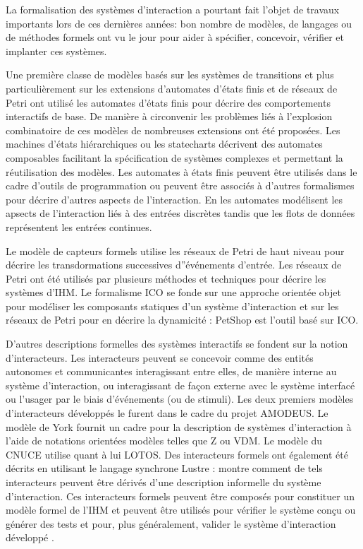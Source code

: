 \documentclass{ihm}
\begin{document}
La formalisation des systèmes d'interaction a pourtant fait l'objet de
travaux  importants  lors  de  ces dernières  années:  bon  nombre  de
modèles, de langages ou de méthodes  formels ont vu le jour pour aider
à spécifier, concevoir, vérifier et implanter ces systèmes.

Une première classe  de modèles basés sur les  systèmes de transitions
et plus particulièrement sur  les extensions d'automates d'états finis
et de  réseaux de Petri ont  utilisé les automates d'états  finis pour
décrire  des   comportements  interactifs  de  base.    De  manière  à
circonvenir  les  problèmes liés  à  l'explosion  combinatoire de  ces
modèles  de  nombreuses extensions  ont  été  proposées. Les  machines
d'états  hiérarchiques  ou  les statecharts  décrivent  des  automates
composables  facilitant  la  spécification de  systèmes  complexes  et
permettant la réutilisation  des modèles. Les automates  à états finis
peuvent  être  utilisés  dans   le  cadre  d'outils  de  programmation
\cite{Blanch02,Blanch06}   ou  peuvent   être   associés  à   d'autres
formalismes      pour      décrire       d'autres      aspects      de
l'interaction. En \cite{Jacob99} les  automates modélisent les apsects
de l'interaction liés à des entrées  discrètes tandis que les flots de
données représentent les entrées continues. 

Le modèle  de capteurs formels  \cite{Accot97} utilise les  réseaux de
Petri de haut niveau  \cite{Jensen95} pour décrire les transdormations
successives  d''événements  d'entrée. Les  réseaux  de  Petri ont  été
utilisés  par  plusieurs  méthodes  et  techniques  pour  décrire  les
systèmes  d'IHM.  Le  formalisme  ICO \cite{palanque93,palanque97}  se
fonde sur  une approche orientée  objet pour modéliser  les composants
statiques d'un système d'interaction et  sur les réseaux de Petri pour
en  décrire  la  dynamicité  :  PetShop  \cite{Bastide02,Schyn03}  est
l'outil basé sur ICO.

D'autres descriptions  formelles des  systèmes interactifs  se fondent
sur la  notion d'interacteurs.  Les interacteurs  peuvent se concevoir
comme  des  entités  autonomes et  communicantes  interagissant  entre
elles, de  manière interne au système  d'interaction, ou interagissant
de façon  externe avec le système  interfacé ou l'usager par  le biais
d'événements (ou de stimuli). Les deux premiers modèles d'interacteurs
développés le  furent dans le  cadre du  projet AMODEUS. Le  modèle de
York \cite{york93}  fournit un cadre  pour la description  de systèmes
d'interaction à l'aide de notations  orientées modèles telles que Z ou
VDM.   Le  modèle  du  CNUCE  \cite{Paterno92}  utilise  quant  à  lui
LOTOS. Des interacteurs formels ont également été décrits en utilisant
le  langage synchrone  Lustre :  \cite{nousdsvis96} montre  comment de
tels interacteurs peuvent être dérivés d'une description informelle du
système d'interaction. Ces interacteurs  formels peuvent être composés
pour constituer  un modèle  formel de l'IHM  et peuvent  être utilisés
pour vérifier le système conçu  ou générer des tests \cite{dsvis98} et
pour, plus  généralement, valider  le système  d'interaction développé
\cite{ausbourg98}. 
\end{document}
